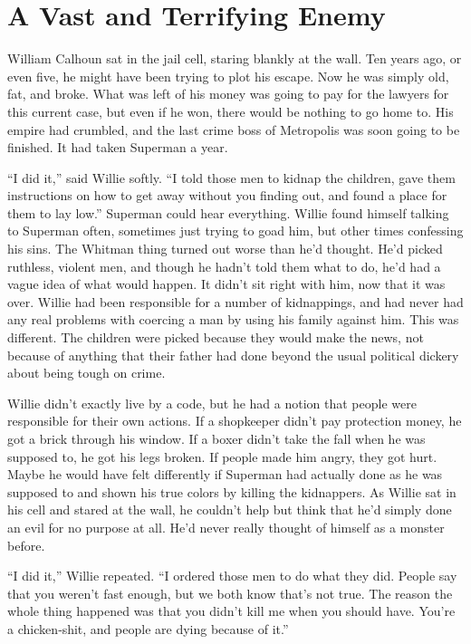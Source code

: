 \documentclass[ebook,12pt]{memoir}
\begin{document}
\hypertarget{a-vast-and-terrifying-enemy}{%
\chapter{A Vast and Terrifying
Enemy}\label{a-vast-and-terrifying-enemy}}

William Calhoun sat in the jail cell, staring blankly at the wall. Ten
years ago, or even five, he might have been trying to plot his escape.
Now he was simply old, fat, and broke. What was left of his money was
going to pay for the lawyers for this current case, but even if he won,
there would be nothing to go home to. His empire had crumbled, and the
last crime boss of Metropolis was soon going to be finished. It had
taken Superman a year.

``I did it,'' said Willie softly. ``I told those men to kidnap the
children, gave them instructions on how to get away without you finding
out, and found a place for them to lay low.'' Superman could hear
everything. Willie found himself talking to Superman often, sometimes
just trying to goad him, but other times confessing his sins. The
Whitman thing turned out worse than he'd thought. He'd picked ruthless,
violent men, and though he hadn't told them what to do, he'd had a vague
idea of what would happen. It didn't sit right with him, now that it was
over. Willie had been responsible for a number of kidnappings, and had
never had any real problems with coercing a man by using his family
against him. This was different. The children were picked because they
would make the news, not because of anything that their father had done
beyond the usual political dickery about being tough on crime.

Willie didn't exactly live by a code, but he had a notion that people
were responsible for their own actions. If a shopkeeper didn't pay
protection money, he got a brick through his window. If a boxer didn't
take the fall when he was supposed to, he got his legs broken. If people
made him angry, they got hurt. Maybe he would have felt differently if
Superman had actually done as he was supposed to and shown his true
colors by killing the kidnappers. As Willie sat in his cell and stared
at the wall, he couldn't help but think that he'd simply done an evil
for no purpose at all. He'd never really thought of himself as a monster
before.

``I did it,'' Willie repeated. ``I ordered those men to do what they
did. People say that you weren't fast enough, but we both know that's
not true. The reason the whole thing happened was that you didn't kill
me when you should have. You're a chicken‐shit, and people are dying
because of it.''
\end{document}
